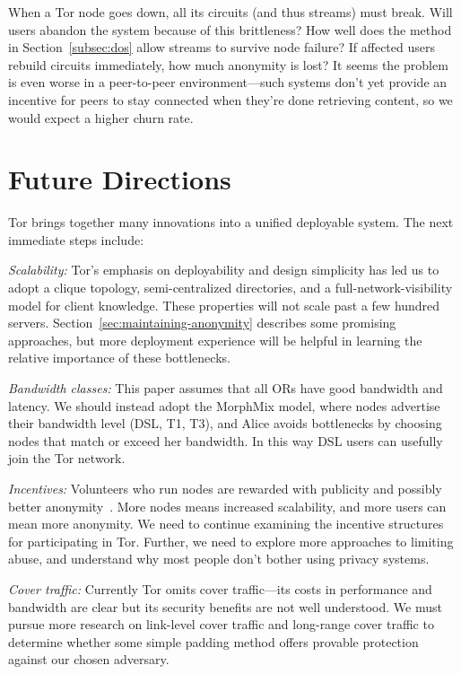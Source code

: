 \documentclass[twocolumn]{article}
\begin{document}

When a Tor node goes down, all its circuits (and thus streams) must break.
Will users abandon the system because of this brittleness? How well
does the method in Section~\ref{subsec:dos} allow streams to survive
node failure? If affected users rebuild circuits immediately, how much
anonymity is lost? It seems the problem is even worse in a peer-to-peer
environment---such systems don't yet provide an incentive for peers to
stay connected when they're done retrieving content, so we would expect
a higher churn rate.


\section{Future Directions}
\label{sec:conclusion}

Tor brings together many innovations into a unified deployable system. The
next immediate steps include:

\emph{Scalability:} Tor's emphasis on deployability and design simplicity
has led us to adopt a clique topology, semi-centralized
directories, and a full-network-visibility model for client
knowledge. These properties will not scale past a few hundred servers.
Section~\ref{sec:maintaining-anonymity} describes some promising
approaches, but more deployment experience will be helpful in learning
the relative importance of these bottlenecks.

\emph{Bandwidth classes:} This paper assumes that all ORs have
good bandwidth and latency. We should instead adopt the MorphMix model,
where nodes advertise their bandwidth level (DSL, T1, T3), and
Alice avoids bottlenecks by choosing nodes that match or
exceed her bandwidth. In this way DSL users can usefully join the Tor
network.

\emph{Incentives:} Volunteers who run nodes are rewarded with publicity
and possibly better anonymity~\cite{econymics}. More nodes means increased
scalability, and more users can mean more anonymity. We need to continue
examining the incentive structures for participating in Tor. Further,
we need to explore more approaches to limiting abuse, and understand
why most people don't bother using privacy systems.

\emph{Cover traffic:} Currently Tor omits cover traffic---its costs
in performance and bandwidth are clear but its security benefits are
not well understood. We must pursue more research on link-level cover
traffic and long-range cover traffic to determine whether some simple padding
method offers provable protection against our chosen adversary.
\end{document}
